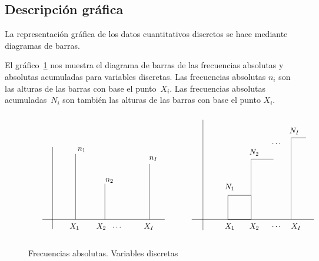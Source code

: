 \documentclass[12pt]{report}
\begin{document}
\subsection{Descripción gráfica}

La representación gráfica de  los datos cuantitativos discretos se hace mediante
diagramas de barras.

 El gráfico~\ref{FAAVQD}  nos muestra el diagrama de barras de las frecuencias absolutas y
 absolutas acumuladas para  variables
discretas. Las frecuencias absolutas $n_i$ son las alturas de las barras con base el
punto~$X_i$. Las frecuencias absolutas acumuladas~$N_i$ son también las alturas de las
barras con base el punto $X_i$.


\begin{figure}
$$
\begin{tabular}{ll}
{\tt    \setlength{\unitlength}{0.70pt}
\begin{picture}(255,178)
\thinlines    \put(210,143){$n_I$}
              \put(128,102){$n_2$}
              \put(76,160){$n_1$}
              \put(200,14){$X_I$}
              \put(141,13){$\cdots$}
              \put(111,14){$X_2$}
              \put(61,14){$X_1$}
              \put(210,31){\line(0,1){104}}
              \put(127,31){\line(0,1){67}}
              \put(72,31){\line(0,1){123}}
              \put(10,31){\line(1,0){229}}
              \put(29,167){\line(0,-1){154}}
\end{picture}}
& {\tt    \setlength{\unitlength}{0.70pt}
\begin{picture}(249,228)
\thinlines    \put(31,11){\line(0,1){207}}
              \put(193,193){$N_I$}
              \put(118,153){$N_2$}
              \put(72,88){$N_1$}
              \put(160,170){$\cdots$}
              \put(196,184){\line(1,0){28}}
              \put(196,31){\line(0,1){153}}
              \put(121,144){\line(1,0){42}}
              \put(121,77){\line(0,1){67}}
              \put(78,31){\framebox(43,45){}}
              \put(196,14){$X_I$}
              \put(160,14){$\cdots$}
              \put(118,14){$X_2$}
              \put(72,14){$X_1$}
              \put(10,31){\line(1,0){229}}
\end{picture}}
\end{tabular}
$$
\caption{Frecuencias absolutas. Variables discretas} \label{FAAVQD}
\end{figure}
\end{document}
